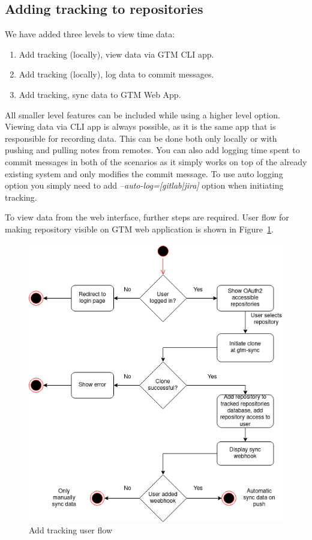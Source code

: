 \subsection{Adding tracking to repositories}\label{subsec:adding-tracking}
We have added three levels to view time data:
\begin{enumerate}
    \item Add tracking (locally), view data via GTM CLI app.
    \item Add tracking (locally), log data to commit messages.
    \item Add tracking, sync data to GTM Web App.
\end{enumerate}

All smaller level features can be included while using a higher level option.
Viewing data via CLI app is always possible, as it is the same app that is responsible for recording data.
This can be done both only locally or with pushing and pulling notes from remotes. %
You can also add logging time spent to commit messages in both of the scenarios as it simply works on top of the already
existing system and only modifies the commit message.
To use auto logging option you simply need to add \textit{--auto-log=[gitlab|jira]} option when initiating tracking. %

To view data from the web interface, further steps are required.
User flow for making repository visible on GTM web application is shown in Figure~\ref{fig:add-tracking-user-flow}.

\begin{figure}[h]
    \includegraphics[width=\textwidth]{figures/add_repo_user_flow}
    \caption{Add tracking user flow}
    \label{fig:add-tracking-user-flow}
\end{figure}

